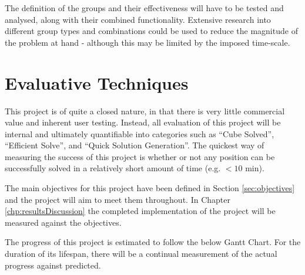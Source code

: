 \documentclass{report}
\begin{document}
    The definition of the groups and their effectiveness will have to be tested and analysed, along with their combined functionality. Extensive research into different group types and combinations could be used to reduce the magnitude of the problem at hand - although this may be limited by the imposed time-scale.
    
    \section{Evaluative Techniques}
    
    This project is of quite a closed nature, in that there is very little commercial value and inherent user testing. Instead, all evaluation of this project will be internal and ultimately quantifiable into categories such as \enquote{Cube Solved}, \enquote{Efficient Solve}, and \enquote{Quick Solution Generation}. The quickest way of measuring the success of this project is whether or not any position can be successfully solved in a relatively short amount of time (e.g. $<10$ \si{\minute}). 
    
    The main objectives for this project have been defined in Section \ref{sec:objectives} and the project will aim to meet them throughout. In Chapter \ref{chp:resultsDiscussion} the completed implementation of the project will be measured against the objectives.
    
    The progress of this project is estimated to follow the below Gantt Chart. For the duration of its lifespan, there will be a continual measurement of the actual progress against predicted.
    
\end{document}
